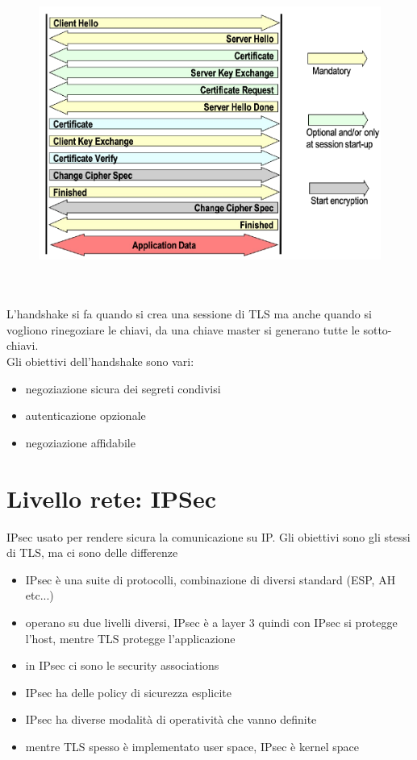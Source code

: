 \documentclass[12pt, oneside]{extbook} %
\begin{document}
\begin{figure}[h!]
    \centering
    \includegraphics[scale=0.5]{../../immagini/tls_hs}
\end{figure}
\\\\L'handshake si fa quando si crea una sessione di TLS ma anche quando si vogliono rinegoziare le chiavi, da una chiave master si generano tutte le sotto-chiavi.
\\Gli obiettivi dell'handshake sono vari:
\begin{itemize}
    \item negoziazione sicura dei segreti condivisi
    \item autenticazione opzionale
    \item negoziazione affidabile
\end{itemize}

\section{Livello rete: IPSec}
IPsec usato per rendere sicura la comunicazione su IP. Gli obiettivi sono gli stessi di TLS, ma ci sono delle differenze
\begin{itemize}
    \item IPsec è una suite di protocolli, combinazione di diversi standard (ESP, AH etc...)
    \item operano su due livelli diversi, IPsec è a layer 3 quindi con IPsec si protegge l'host, mentre TLS protegge l'applicazione
    \item in IPsec ci sono le security associations
    \item IPsec ha delle policy di sicurezza esplicite
    \item IPsec ha diverse modalità di operatività che vanno definite
    \item mentre TLS spesso è implementato user space, IPsec è kernel space
\end{itemize}
\end{document}
